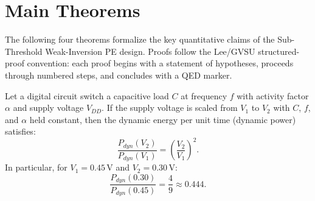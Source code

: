 \section{Main Theorems}
\label{sec:theorems}

The following four theorems formalize the key quantitative claims of the Sub-Threshold
Weak-Inversion PE design.  Proofs follow the Lee/GVSU structured-proof convention: each
proof begins with a statement of hypotheses, proceeds through numbered steps, and concludes
with a QED marker.

\begin{theorem}
\label{thm:quadratic_savings}
Let a digital circuit switch a capacitive load $C$ at frequency $f$ with activity factor
$\alpha$ and supply voltage $V_{DD}$.  If the supply voltage is scaled from $V_1$ to $V_2$
with $C$, $f$, and $\alpha$ held constant, then the dynamic energy per unit time (dynamic
power) satisfies:
\[
  \frac{P_{dyn}(V_2)}{P_{dyn}(V_1)} = \left(\frac{V_2}{V_1}\right)^2.
\]
In particular, for $V_1 = 0.45\,\text{V}$ and $V_2 = 0.30\,\text{V}$:
\[
  \frac{P_{dyn}(0.30)}{P_{dyn}(0.45)} = \frac{4}{9} \approx 0.444.
\]
\end{theorem}

